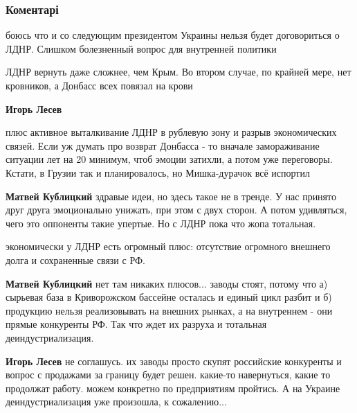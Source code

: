  
 
 
 
 
\subsubsection{Коментарі}
\label{sec:07_06_2018.fb.lesev_igor.1.donbass.cmt}

\begin{itemize} %
боюсь что и со следующим президентом Украины нельзя будет договориться о ЛДНР. Слишком болезненный вопрос для внутренней политики

\begin{itemize} %
ЛДНР вернуть даже сложнее, чем Крым. Во втором случае, по крайней мере, нет кровников, а Донбасс всех повязал на крови

\textbf{Игорь Лесев} 

плюс активное выталкивание ЛДНР в рублевую зону и разрыв экономических связей.
Если уж думать про возврат Донбасса - то вначале замораживание ситуации лет на
20 минимум, чтоб эмоции затихли, а потом уже переговоры. Кстати, в Грузии так и
планировалось, но Мишка-дурачок всё испортил

\textbf{Матвей Кублицкий} здравые идеи, но здесь такое не в тренде. У нас принято друг друга эмоционально унижать, при этом с двух сторон. А потом удивляться, чего это оппоненты такие упертые. Но с ЛДНР пока что жопа тотальная.

экономически у ЛДНР есть огромный плюс: отсутствие огромного внешнего долга и сохраненные связи с РФ.

\textbf{Матвей Кублицкий} нет там никаких плюсов... заводы стоят, потому что а) сырьевая база в Криворожском бассейне осталась и единый цикл разбит и б) продукцию нельзя реализовывать на внешних рынках, а на внутреннем - они прямые конкуренты РФ. Так что ждет их разруха и тотальная деиндустриализация.

\textbf{Игорь Лесев} не соглашусь. их заводы просто скупят российские конкуренты и вопрос с продажами за границу будет решен. какие-то навернуться, какие то продолжат работу. можем конкретно по предприятиям пройтись. А на Украине деиндустриализация уже произошла, к сожалению...


\end{itemize}
\end{itemize}
